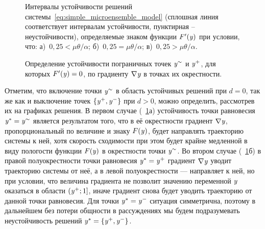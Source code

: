 \begin{figure}[ht]
    \begin{minipage}{\textwidth}
        \caption{Интервалы устойчивости решений системы~\eqref{eq:simple_microensemble_model} (сплошная линия соответствует интервалам устойчивости, пунктирная -- неустойчивости), определяемые знаком функции $F^{\prime}(\mathit{y})$ при условии, что: а)~$0,25 < \mu \theta / \alpha$; б)~$0,25 = \mu \theta / \alpha$; в)~$0,25 > \mu \theta / \alpha$.}
        \label{fig:analysis_sigm_stability}
    \end{minipage}
    \begin{minipage}{\textwidth}
        \caption{Определение устойчивости пограничных точек $\mathit{y}^{\sim}$ и $\mathit{y}^{+}$, для которых $F^{\prime}(\mathit{y}) = 0$, по градиенту $\nabla\mathit{y}$ в точках их окрестности.} 
        \label{fig:analysis_sigm_bound_points}
    \end{minipage}
\end{figure}

Отметим, что включение точки $\mathit{y}^{\sim}$ в область устойчивых решений при $d = 0$, так же как и выключение точек $\left\{\mathit{y}^{+}, \mathit{y}^{-}\right\}$ при $d > 0$, можно определить, рассмотрев их на графиках решения. В первом случае (\seefigure~\ref{fig:analysis_sigm_bound_points}а) устойчивость точки равновесия $\mathit{y}^{*} = \mathit{y}^{\sim}$ является результатом того, что в её окрестности градиент $\nabla\mathit{y}$, пропорциональный по величине и знаку $F(\mathit{y})$, будет направлять траекторию системы к ней, хотя скорость сходимости при этом будет крайне медленной в виду пологости функции $F(\mathit{y})$ в окрестности точки $\mathit{y}^{\sim}$. Во втором случае (\seefigure~\ref{fig:analysis_sigm_bound_points}б) в правой полуокрестности точки равновесия $\mathit{y}^{*} = \mathit{y}^{+}$ градиент $\nabla\mathit{y}$ уводит траекторию системы от неё, а в левой полуокрестности --- направляет к ней, но при условии, что величина градиента не позволит значению переменной $\mathit{y}$ оказаться в области $\left(\mathit{y}^{+}; 1\right]$, иначе градиент снова будет уводить траекторию от данной точки равновесия. Для точки $\mathit{y}^{*} = \mathit{y}^{-}$ ситуация симметрична, поэтому в дальнейшем без потери общности в рассуждениях мы будем подразумевать неустойчивость решений $\mathit{y}^{*} = \left\{\mathit{y}^{+}, \mathit{y}^{-}\right\}$.

